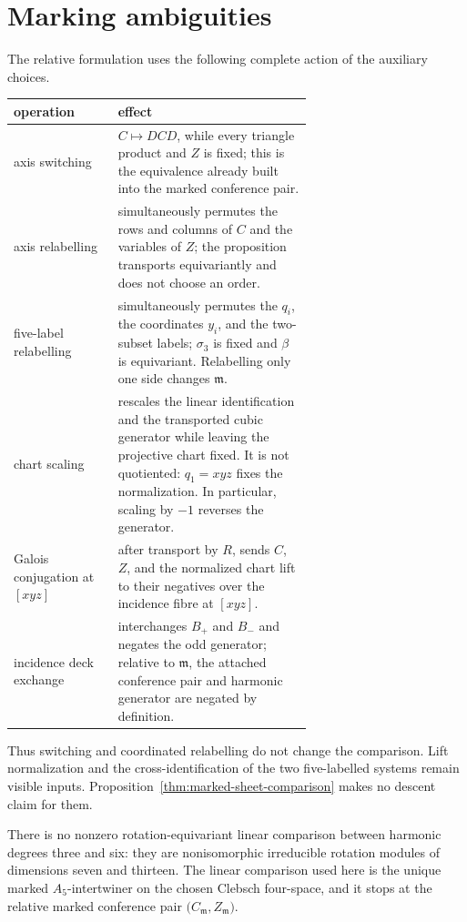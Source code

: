 \section{Marking ambiguities}
\label{app:marking-ambiguities}

The relative formulation uses the following complete action of the auxiliary
choices.

\begin{center}
\begin{tabular}{@{}l p{0.65\linewidth}@{}}
\hline
operation & effect \\
\hline
axis switching &
\(C\mapsto DCD\), while every triangle product and \(Z\) is fixed; this is
the equivalence already built into the marked conference pair. \\
axis relabelling &
simultaneously permutes the rows and columns of \(C\) and the variables of
\(Z\); the proposition transports equivariantly and does not choose an order. \\
five-label relabelling &
simultaneously permutes the \(q_i\), the coordinates \(y_i\), and the
two-subset labels; \(\sigma_3\) is fixed and \(\beta\) is equivariant.
Relabelling only one side changes \(\mathfrak m\). \\
chart scaling &
rescales the linear identification and the transported cubic generator while
leaving the projective chart fixed.  It is not quotiented: \(q_1=xyz\) fixes
the normalization.  In particular, scaling by \(-1\) reverses the generator. \\
Galois conjugation at \([xyz]\) &
after transport by \(R\), sends \(C\), \(Z\), and the normalized chart lift
to their negatives over the incidence fibre at \([xyz]\). \\
incidence deck exchange &
interchanges \(B_+\) and \(B_-\) and negates the odd generator; relative to
\(\mathfrak m\), the attached conference pair and harmonic generator are negated by
definition. \\
\hline
\end{tabular}
\end{center}

Thus switching and coordinated relabelling do not change the comparison.
Lift normalization and the cross-identification of the two five-labelled
systems remain visible inputs.  Proposition~\ref{thm:marked-sheet-comparison}
makes no descent claim for them.

There is no nonzero rotation-equivariant linear comparison between harmonic
degrees three and six: they are nonisomorphic irreducible rotation modules of
dimensions seven and thirteen.  The linear comparison used here is the unique
marked \(A_5\)-intertwiner on the chosen Clebsch four-space, and it stops at
the relative marked conference pair
\(\bigl(C_{\mathfrak m},Z_{\mathfrak m}\bigr)\).
